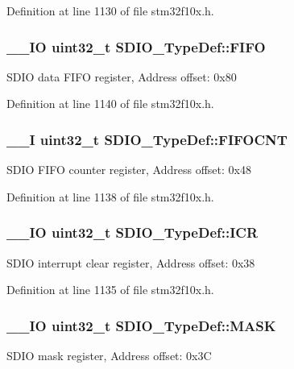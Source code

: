 Definition at line 1130 of file stm32f10x.\-h.

\hypertarget{struct_s_d_i_o___type_def_ab4757027388ea3a0a6f114d7de2ed4cf}{
\subsubsection[{F\-I\-F\-O}]{\setlength{\rightskip}{0pt plus 5cm}\-\_\-\-\_\-\-I\-O {\bf uint32\-\_\-t} S\-D\-I\-O\-\_\-\-Type\-Def\-::\-F\-I\-F\-O}}\label{struct_s_d_i_o___type_def_ab4757027388ea3a0a6f114d7de2ed4cf}
S\-D\-I\-O data F\-I\-F\-O register, Address offset\-: 0x80 

Definition at line 1140 of file stm32f10x.\-h.

\hypertarget{struct_s_d_i_o___type_def_ae30d52b6556f5d17db8e5cfd2641e7b4}{
\subsubsection[{F\-I\-F\-O\-C\-N\-T}]{\setlength{\rightskip}{0pt plus 5cm}\-\_\-\-\_\-\-I {\bf uint32\-\_\-t} S\-D\-I\-O\-\_\-\-Type\-Def\-::\-F\-I\-F\-O\-C\-N\-T}}\label{struct_s_d_i_o___type_def_ae30d52b6556f5d17db8e5cfd2641e7b4}
S\-D\-I\-O F\-I\-F\-O counter register, Address offset\-: 0x48 

Definition at line 1138 of file stm32f10x.\-h.

\hypertarget{struct_s_d_i_o___type_def_ae3c052b85cc438d2b3069f99620e5139}{
\subsubsection[{I\-C\-R}]{\setlength{\rightskip}{0pt plus 5cm}\-\_\-\-\_\-\-I\-O {\bf uint32\-\_\-t} S\-D\-I\-O\-\_\-\-Type\-Def\-::\-I\-C\-R}}\label{struct_s_d_i_o___type_def_ae3c052b85cc438d2b3069f99620e5139}
S\-D\-I\-O interrupt clear register, Address offset\-: 0x38 

Definition at line 1135 of file stm32f10x.\-h.

\hypertarget{struct_s_d_i_o___type_def_a9a08e405ab985c60ff9031025ab37d31}{
\subsubsection[{M\-A\-S\-K}]{\setlength{\rightskip}{0pt plus 5cm}\-\_\-\-\_\-\-I\-O {\bf uint32\-\_\-t} S\-D\-I\-O\-\_\-\-Type\-Def\-::\-M\-A\-S\-K}}\label{struct_s_d_i_o___type_def_a9a08e405ab985c60ff9031025ab37d31}
S\-D\-I\-O mask register, Address offset\-: 0x3\-C 

